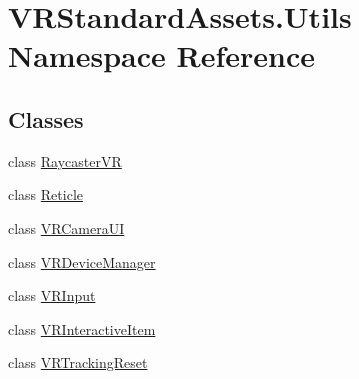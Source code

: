 \hypertarget{namespace_v_r_standard_assets_1_1_utils}{}\section{V\+R\+Standard\+Assets.\+Utils Namespace Reference}
\label{namespace_v_r_standard_assets_1_1_utils}
\subsection*{Classes}
\begin{DoxyCompactItemize}
\item 
class \mbox{\hyperlink{class_v_r_standard_assets_1_1_utils_1_1_raycaster_v_r}{Raycaster\+VR}}
\item 
class \mbox{\hyperlink{class_v_r_standard_assets_1_1_utils_1_1_reticle}{Reticle}}
\item 
class \mbox{\hyperlink{class_v_r_standard_assets_1_1_utils_1_1_v_r_camera_u_i}{V\+R\+Camera\+UI}}
\item 
class \mbox{\hyperlink{class_v_r_standard_assets_1_1_utils_1_1_v_r_device_manager}{V\+R\+Device\+Manager}}
\item 
class \mbox{\hyperlink{class_v_r_standard_assets_1_1_utils_1_1_v_r_input}{V\+R\+Input}}
\item 
class \mbox{\hyperlink{class_v_r_standard_assets_1_1_utils_1_1_v_r_interactive_item}{V\+R\+Interactive\+Item}}
\item 
class \mbox{\hyperlink{class_v_r_standard_assets_1_1_utils_1_1_v_r_tracking_reset}{V\+R\+Tracking\+Reset}}
\end{DoxyCompactItemize}
